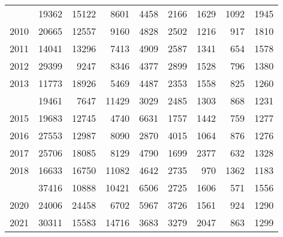 \documentclass[
]{article}
\begin{document}
\begin{longtable}[t]{lrrrrrrrr}
\addlinespace
2009 & 19362 & 15122 & 8601 & 4458 & 2166 & 1629 & 1092 & 1945\\
2010 & 20665 & 12557 & 9160 & 4828 & 2502 & 1216 & 917 & 1810\\
2011 & 14041 & 13296 & 7413 & 4909 & 2587 & 1341 & 654 & 1578\\
2012 & 29399 & 9247 & 8346 & 4377 & 2899 & 1528 & 796 & 1380\\
2013 & 11773 & 18926 & 5469 & 4487 & 2353 & 1558 & 825 & 1260\\
\addlinespace
2014 & 19461 & 7647 & 11429 & 3029 & 2485 & 1303 & 868 & 1231\\
2015 & 19683 & 12745 & 4740 & 6631 & 1757 & 1442 & 759 & 1277\\
2016 & 27553 & 12987 & 8090 & 2870 & 4015 & 1064 & 876 & 1276\\
2017 & 25706 & 18085 & 8129 & 4790 & 1699 & 2377 & 632 & 1328\\
2018 & 16633 & 16750 & 11082 & 4642 & 2735 & 970 & 1362 & 1183\\
\addlinespace
2019 & 37416 & 10888 & 10421 & 6506 & 2725 & 1606 & 571 & 1556\\
2020 & 24006 & 24458 & 6702 & 5967 & 3726 & 1561 & 924 & 1290\\
2021 & 30311 & 15583 & 14716 & 3683 & 3279 & 2047 & 863 & 1299\\*
\end{longtable}
\end{document}
